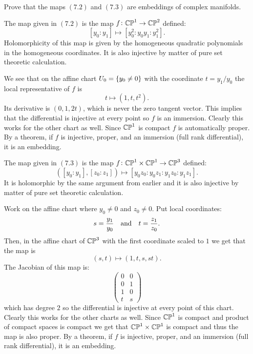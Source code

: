 \documentclass[11pt, a4paper]{article}
\begin{document}
\begin{exercise}
  Prove that the maps $(7.2)$ and $(7.3)$ are embeddings of
  complex manifolds.
\end{exercise}
\begin{solution}
  The map given in $(7.2)$ is the map $f \colon \mathbb{CP}^1 \to \mathbb{CP}^2$ defined:
  \[
    [y_0 : y_1] \mapsto [y_0^2 : y_0 y_1 : y_1^2].
  \]
  Holomorphicity of this map is given by the homogeneous
  quadratic polynomials in the homogeneous coordinates.
  It is also injective by matter of pure set theoretic calculation.

  We see that on the affine chart $U_0 = \left\{y_0 \neq 0\right\}$ with
  the coordinate $t = y_1/y_0$ the local representative of $f$
  is
  \[
    t \mapsto (1,t,t^2).
  \]
  Its derivative is $(0,1,2t)$, which is never the zero tangent vector.
  This implies that the differential is injective at every point so $f$
  is an immersion.
  Clearly this works for the other chart as well.
  Since $\mathbb{CP}^1$ is compact $f$ is automatically proper.
  By a theorem, if $f$ is injective, proper, and an immersion (full rank
  differential), it is an embedding.
  
  The map given in $(7.3)$ is the map $f \colon \mathbb{CP}^1 \times \mathbb{CP}^1 \to \mathbb{CP}^3$
  defined:
  \[
    ([y_0 : y_1],[z_0 : z_1]) \mapsto [y_0 z_0 : y_0 z_1 : y_1 z_0 : y_1 z_1].
  \]
  It is holomorphic by the same argument
  from earlier and it is also injective by matter of pure set
  theoretic calculation.

  Work on the affine chart where $y_0 \neq 0$ and $z_0 \neq 0$.
  Put local coordinates:
  \[
    s = \frac{y_{1}}{y_{0}} \quad \text{and} \quad
    t = \frac{z_{1}}{z_{0}}.
  \]
  Then, in the affine chart of $\mathbb{CP}^3$ with the first coordinate scaled
  to $1$ we get that the map is
  \[
    (s,t) \mapsto (1,t,s,st).
  \]
  The Jacobian of this map is:
  \[
  \begin{pmatrix}
    0 & 0 \\
    0 & 1 \\
    1 & 0 \\
    t & s
  \end{pmatrix}
  \]
  which has degree $2$ so the differential is injective at every point
  of this chart.
  Clearly this works for the other charts as well.
  Since $\mathbb{CP}^1$ is compact and product of compact spaces is compact
  we get that $\mathbb{CP}^1 \times \mathbb{CP}^1$ is compact and thus the map is also proper.
  By a theorem, if $f$ is injective, proper, and an immersion (full rank
  differential), it is an embedding.
\end{solution}
\end{document}
